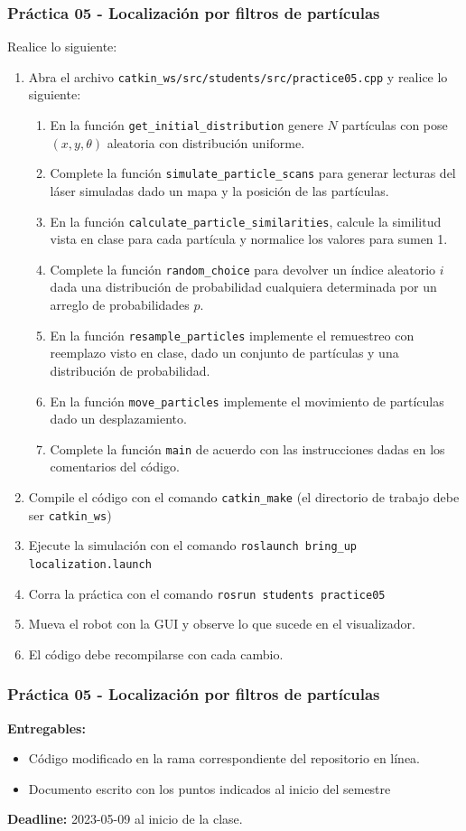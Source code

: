 \begin{frame}[containsverbatim]\frametitle{Práctica 05 - Localización por filtros de partículas}
Realice lo siguiente:
  \begin{enumerate}
  \item Abra el archivo \texttt{catkin\_ws/src/students/src/practice05.cpp} y realice lo siguiente:
    \begin{enumerate}
    \item En la función \texttt{get\_initial\_distribution} genere $N$ partículas con pose $(x,y,\theta)$ aleatoria con distribución uniforme. 
    \item Complete la función \texttt{simulate\_particle\_scans} para generar lecturas del láser simuladas dado un mapa y la posición de las partículas. 
    \item En la función \texttt{calculate\_particle\_similarities}, calcule la similitud vista en clase para cada partícula y normalice los valores para sumen 1.
    \item Complete la función \texttt{random\_choice} para devolver un índice aleatorio $i$ dada una distribución de probabilidad cualquiera determinada por un arreglo de probabilidades $p$.
    \item En la función \texttt{resample\_particles} implemente el remuestreo con reemplazo visto en clase, dado un conjunto de partículas y una distribución de probabilidad.
    \item En la función \texttt{move\_particles} implemente el movimiento de partículas dado un desplazamiento.
    \item Complete la función \texttt{main} de acuerdo con las instrucciones dadas en los comentarios del código. 
    \end{enumerate}
  \item Compile el código con el comando \texttt{catkin\_make} (el directorio de trabajo debe ser \texttt{catkin\_ws})
  \item Ejecute la simulación con el comando \texttt{roslaunch bring\_up localization.launch}
  \item Corra la práctica con el comando \texttt{rosrun students practice05}
  \item Mueva el robot con la GUI y observe lo que sucede en el visualizador. 
  \item El código debe recompilarse con cada cambio. 
  \end{enumerate}
\end{frame}

\begin{frame}[containsverbatim]\frametitle{Práctica 05 - Localización por filtros de partículas}
 \textbf{Entregables:}
  \begin{itemize}
  \item Código modificado en la rama correspondiente del repositorio en línea.
  \item Documento escrito con los puntos indicados al inicio del semestre
  \end{itemize}
  \textbf{Deadline: } 2023-05-09 al inicio de la clase. 
\end{frame}



